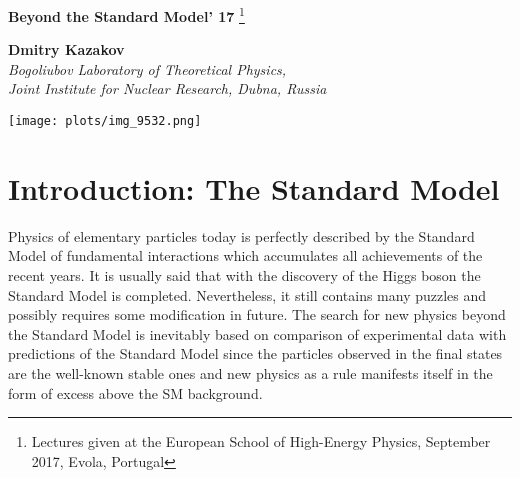 \documentclass{cernyrep}
\begin{document}
 \thispagestyle{empty}
\begin{center}
{\Large \bf   Beyond the Standard Model' 17}
\renewcommand{\thefootnote}{\fnsymbol{footnote}}\footnote[2]{Lectures
given at the European School of High-Energy Physics, September 2017, Evola, Portugal}
\renewcommand{\thefootnote}{\arabic{footnote}}
\vspace{10mm}

{\large \bf Dmitry Kazakov } \\[5mm]

{\it Bogoliubov Laboratory of Theoretical Physics, \\Joint Institute for Nuclear Research,
Dubna, Russia }

\vspace{12mm}

\begin{center}
\texttt{[image: plots/img\_9532.png]}
\end{center}
\vspace{8mm}

\begin{abstract} We discuss the status of the SM - The principles
- The Lagrangian
- The problems
- Open questions
- The ways beyond. Then we consider
possible physics beyond the SM
- New symmetries (Gauge, SUSY, etc)
- New particles (gauge, axion, superpartners)
- New dimensions (extra, large, compact, etc)
- New Paradigm (strings, branes, gravity). In conclusion, we formulate the first priority tasks for the future HEP program.
\end{abstract}
\end{center}

\thispagestyle{empty}


\tableofcontents
\vspace{8mm}

\section{Introduction: The Standard Model}

Physics of elementary particles today is perfectly described by the Standard  Model of fundamental interactions which accumulates all achievements of the recent years. It is usually said that with the discovery of the Higgs boson the Standard Model is completed. Nevertheless, it still contains many puzzles and possibly requires some modification in future. The search for new physics beyond the Standard Model  is inevitably  based on comparison of experimental data with predictions of the Standard Model since the particles observed in the final states are the well-known stable ones and new physics as a rule manifests itself in the form of excess above the SM background. 
\end{document}
